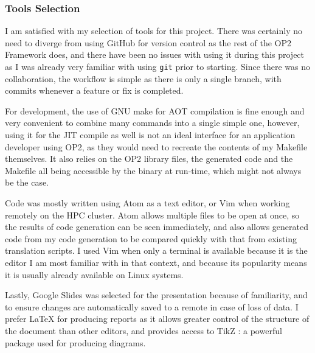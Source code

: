 \subsubsection{Tools Selection}
I am satisfied with my selection of tools for this project. There was certainly no need to diverge from using GitHub for version control as the rest of the OP2 Framework does, and there have been no issues with using it during this project as I was already very familiar with using \verb|git| prior to starting. Since there was no collaboration, the workflow is simple as there is only a single branch, with commits whenever a feature or fix is completed.
\par
For development, the use of GNU make for AOT compilation is fine enough and very convenient to combine many commands into a single simple one, however, using it for the JIT compile as well is not an ideal interface for an application developer using OP2, as they would need to recreate the contents of my Makefile themselves. It also relies on the OP2 library files, the generated code and the Makefile all being accessible by the binary at run-time, which might not always be the case.
\par
Code was mostly written using Atom \cite{atom} as a text editor, or Vim \cite{vim} when working remotely on the HPC cluster. Atom allows multiple files to be open at once, so the results of code generation can be seen immediately, and also allows generated code from my code generation to be compared quickly with that from existing translation scripts. I used Vim when only a terminal is available because it is the editor I am most familiar with in that context, and because its popularity means it is usually already available on Linux systems.
\par
Lastly, Google Slides \cite{gslides} was selected for the presentation because of familiarity, and to ensure changes are automatically saved to a remote in case of loss of data. I prefer LaTeX for producing reports as it allows greater control of the structure of the document than other editors, and provides access to TikZ \cite{tikz}: a powerful package used for producing diagrams.
